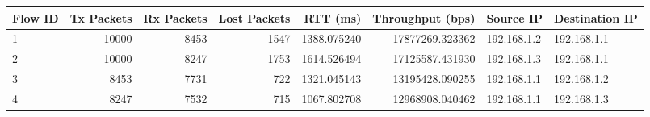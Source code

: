 \begin{tabular}{lrrrrrll}
\toprule
Flow ID & Tx Packets & Rx Packets & Lost Packets & RTT (ms) & Throughput (bps) & Source IP & Destination IP \\
\midrule
1 & 10000 & 8453 & 1547 & 1388.075240 & 17877269.323362 & 192.168.1.2 & 192.168.1.1 \\
2 & 10000 & 8247 & 1753 & 1614.526494 & 17125587.431930 & 192.168.1.3 & 192.168.1.1 \\
3 & 8453 & 7731 & 722 & 1321.045143 & 13195428.090255 & 192.168.1.1 & 192.168.1.2 \\
4 & 8247 & 7532 & 715 & 1067.802708 & 12968908.040462 & 192.168.1.1 & 192.168.1.3 \\
\bottomrule
\end{tabular}
